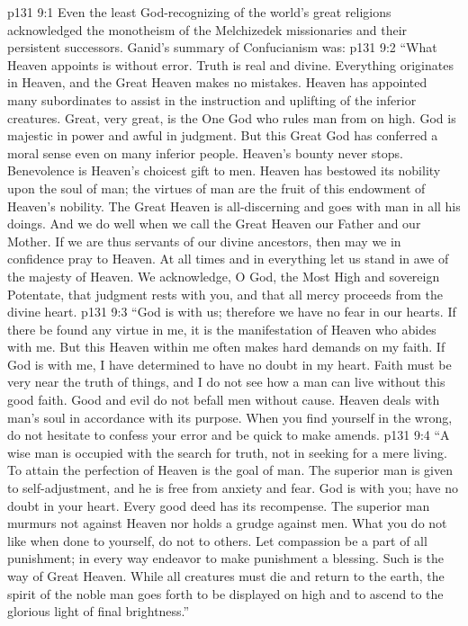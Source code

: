 \vs p131 9:1 Even the least God\hyp{}recognizing of the world’s great religions acknowledged the monotheism of the Melchizedek missionaries and their persistent successors. Ganid’s summary of Confucianism was:
\pc \vs p131 9:2 “What Heaven appoints is without error. Truth is real and divine. Everything originates in Heaven, and the Great Heaven makes no mistakes. Heaven has appointed many subordinates to assist in the instruction and uplifting of the inferior creatures. Great, very great, is the One God who rules man from on high. God is majestic in power and awful in judgment. But this Great God has conferred a moral sense even on many inferior people. Heaven’s bounty never stops. Benevolence is Heaven’s choicest gift to men. Heaven has bestowed its nobility upon the soul of man; the virtues of man are the fruit of this endowment of Heaven’s nobility. The Great Heaven is all\hyp{}discerning and goes with man in all his doings. And we do well when we call the Great Heaven our Father and our Mother. If we are thus servants of our divine ancestors, then may we in confidence pray to Heaven. At all times and in everything let us stand in awe of the majesty of Heaven. We acknowledge, O God, the Most High and sovereign Potentate, that judgment rests with you, and that all mercy proceeds from the divine heart.
\vs p131 9:3 “God is with us; therefore we have no fear in our hearts. If there be found any virtue in me, it is the manifestation of Heaven who abides with me. But this Heaven within me often makes hard demands on my faith. If God is with me, I have determined to have no doubt in my heart. Faith must be very near the truth of things, and I do not see how a man can live without this good faith. Good and evil do not befall men without cause. Heaven deals with man’s soul in accordance with its purpose. When you find yourself in the wrong, do not hesitate to confess your error and be quick to make amends.
\vs p131 9:4 “A wise man is occupied with the search for truth, not in seeking for a mere living. To attain the perfection of Heaven is the goal of man. The superior man is given to self\hyp{}adjustment, and he is free from anxiety and fear. God is with you; have no doubt in your heart. Every good deed has its recompense. The superior man murmurs not against Heaven nor holds a grudge against men. What you do not like when done to yourself, do not to others. Let compassion be a part of all punishment; in every way endeavor to make punishment a blessing. Such is the way of Great Heaven. While all creatures must die and return to the earth, the spirit of the noble man goes forth to be displayed on high and to ascend to the glorious light of final brightness.”
